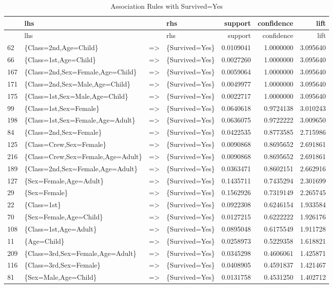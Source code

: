 \documentclass[]{article}
\begin{document}
\begin{longtable}[c]{@{}llllrrr@{}}
\caption{Association Rules with Survived=Yes}\tabularnewline
\toprule
& lhs & & rhs & support & confidence & lift\tabularnewline
\midrule
\endfirsthead
\toprule
& lhs & & rhs & support & confidence & lift\tabularnewline
\midrule
\endhead
62 & \{Class=2nd,Age=Child\} & =\textgreater{} & \{Survived=Yes\} &
0.0109041 & 1.0000000 & 3.095640\tabularnewline
66 & \{Class=1st,Age=Child\} & =\textgreater{} & \{Survived=Yes\} &
0.0027260 & 1.0000000 & 3.095640\tabularnewline
167 & \{Class=2nd,Sex=Female,Age=Child\} & =\textgreater{} &
\{Survived=Yes\} & 0.0059064 & 1.0000000 & 3.095640\tabularnewline
171 & \{Class=2nd,Sex=Male,Age=Child\} & =\textgreater{} &
\{Survived=Yes\} & 0.0049977 & 1.0000000 & 3.095640\tabularnewline
175 & \{Class=1st,Sex=Male,Age=Child\} & =\textgreater{} &
\{Survived=Yes\} & 0.0022717 & 1.0000000 & 3.095640\tabularnewline
99 & \{Class=1st,Sex=Female\} & =\textgreater{} & \{Survived=Yes\} &
0.0640618 & 0.9724138 & 3.010243\tabularnewline
198 & \{Class=1st,Sex=Female,Age=Adult\} & =\textgreater{} &
\{Survived=Yes\} & 0.0636075 & 0.9722222 & 3.009650\tabularnewline
84 & \{Class=2nd,Sex=Female\} & =\textgreater{} & \{Survived=Yes\} &
0.0422535 & 0.8773585 & 2.715986\tabularnewline
125 & \{Class=Crew,Sex=Female\} & =\textgreater{} & \{Survived=Yes\} &
0.0090868 & 0.8695652 & 2.691861\tabularnewline
216 & \{Class=Crew,Sex=Female,Age=Adult\} & =\textgreater{} &
\{Survived=Yes\} & 0.0090868 & 0.8695652 & 2.691861\tabularnewline
189 & \{Class=2nd,Sex=Female,Age=Adult\} & =\textgreater{} &
\{Survived=Yes\} & 0.0363471 & 0.8602151 & 2.662916\tabularnewline
127 & \{Sex=Female,Age=Adult\} & =\textgreater{} & \{Survived=Yes\} &
0.1435711 & 0.7435294 & 2.301699\tabularnewline
29 & \{Sex=Female\} & =\textgreater{} & \{Survived=Yes\} & 0.1562926 &
0.7319149 & 2.265745\tabularnewline
22 & \{Class=1st\} & =\textgreater{} & \{Survived=Yes\} & 0.0922308 &
0.6246154 & 1.933584\tabularnewline
70 & \{Sex=Female,Age=Child\} & =\textgreater{} & \{Survived=Yes\} &
0.0127215 & 0.6222222 & 1.926176\tabularnewline
108 & \{Class=1st,Age=Adult\} & =\textgreater{} & \{Survived=Yes\} &
0.0895048 & 0.6175549 & 1.911728\tabularnewline
11 & \{Age=Child\} & =\textgreater{} & \{Survived=Yes\} & 0.0258973 &
0.5229358 & 1.618821\tabularnewline
209 & \{Class=3rd,Sex=Female,Age=Adult\} & =\textgreater{} &
\{Survived=Yes\} & 0.0345298 & 0.4606061 & 1.425871\tabularnewline
116 & \{Class=3rd,Sex=Female\} & =\textgreater{} & \{Survived=Yes\} &
0.0408905 & 0.4591837 & 1.421467\tabularnewline
81 & \{Sex=Male,Age=Child\} & =\textgreater{} & \{Survived=Yes\} &
0.0131758 & 0.4531250 & 1.402712\tabularnewline
\bottomrule
\end{longtable}
\end{document}
